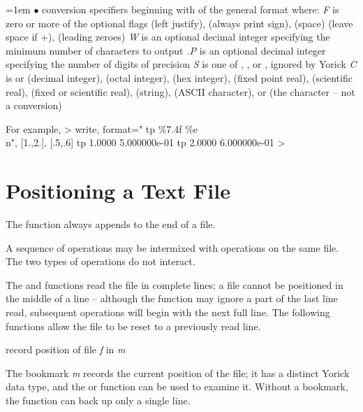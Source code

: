 \hangindent=1em
$\bullet$ conversion specifiers beginning with \kbd{\%} \hfil\break
of the general format  where: \hfil\break
{\it F\/} is zero or more of the optional flags \kbd{-} (left justify),
\kbd{+} (always print sign), (space) (leave space if +), 
(leading zeroes) \hfil\break
{\it W\/} is an optional decimal integer specifying the minimum number
of characters to output \hfil\break
{\it .P\/} is an optional decimal integer specifying the number of
digits of precision \hfil\break
{\it S\/} is one of , , or , ignored by Yorick \hfil\break
{\it C\/} is  or  (decimal integer),  (octal integer),
 (hex integer),  (fixed point real),  (scientific
real),  (fixed or scientific real),  (string), 
(ASCII character), or \kbd{\%} (the \kbd{\%} character -- not a conversion)

For example,
\beginexample
> write, format="   tp \%7.4f \%e\\n", [1.,2.], [.5,.6]
   tp  1.0000 5.000000e-01
   tp  2.0000 6.000000e-01
>
\endexample

\section{Positioning a Text File}

The  function always appends to the end of a file.

A sequence of  operations may be intermixed with 
operations on the same file.  The two types of operations do not
interact.

The  and  functions read the file in complete
lines; a file cannot be positioned in the middle of a line -- although
the  function may ignore a part of the last line read,
subsequent  operations will begin with the next full line.
The following functions allow the file to be reset to a previously
read line.

     {record position of file {\it f\/} in {\it m}}

The bookmark {\it m\/} records the current position of the file; it
has a distinct Yorick data type, and the  or 
function can be used to examine it.  Without a bookmark, the 
function can back up only a single line.

